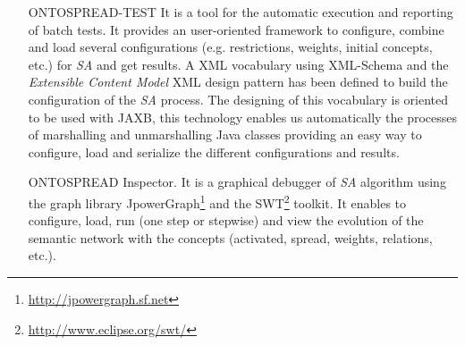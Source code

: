 \begin{itemize}
 \item [ONTOSPREAD-TEST] It is a tool for the automatic execution and reporting
of batch tests. It provides an user-oriented framework to configure, combine and load several
configurations (e.g. restrictions, weights, initial concepts, etc.) for \textit{SA} and get results. A XML
vocabulary using XML-Schema and the \textit{Extensible Content Model} XML design
pattern has been defined to build the configuration of the \textit{SA} process.
 The designing of this vocabulary is oriented to be used with JAXB, this technology enables us 
automatically the processes of marshalling and unmarshalling Java classes providing an easy way to configure, 
load and serialize the different configurations and results. 

\item [ONTOSPREAD Inspector.] It is a graphical debugger of \textit{SA} algorithm 
using the graph library JpowerGraph\footnote{\url{http://jpowergraph.sf.net}} and
the SWT\footnote{\url{http://www.eclipse.org/swt/}} toolkit. It enables to configure, load, 
 run (one step or stepwise) and view the evolution of the semantic network 
 with the concepts (activated, spread, weights, relations, etc.).
\end{itemize}


